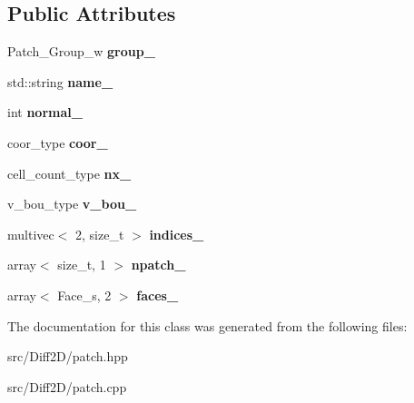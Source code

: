\subsection*{Public Attributes}
\begin{DoxyCompactItemize}
\item 
\hypertarget{classPatch_a93fff2891647c4109c16cb4ec2079545}{
Patch\_\-Group\_\-w {\bfseries group\_\-}}
\label{classPatch_a93fff2891647c4109c16cb4ec2079545}

\item 
\hypertarget{classPatch_a133d268d88897aef8b20ca7da98b9cdb}{
std::string {\bfseries name\_\-}}
\label{classPatch_a133d268d88897aef8b20ca7da98b9cdb}

\item 
\hypertarget{classPatch_a01951c7c7aec32d184e11869ab23877d}{
int {\bfseries normal\_\-}}
\label{classPatch_a01951c7c7aec32d184e11869ab23877d}

\item 
\hypertarget{classPatch_a3beca2ce16697d8e8097ba92ee6bdc29}{
coor\_\-type {\bfseries coor\_\-}}
\label{classPatch_a3beca2ce16697d8e8097ba92ee6bdc29}

\item 
\hypertarget{classPatch_aa69a7e422610ce91ad4fb60c88cadbf0}{
cell\_\-count\_\-type {\bfseries nx\_\-}}
\label{classPatch_aa69a7e422610ce91ad4fb60c88cadbf0}

\item 
\hypertarget{classPatch_a10f2316309ff37fb1238153527eeab48}{
v\_\-bou\_\-type {\bfseries v\_\-bou\_\-}}
\label{classPatch_a10f2316309ff37fb1238153527eeab48}

\item 
\hypertarget{classPatch_af272c0110d640ddd191492fc9cc62990}{
multivec$<$ 2, size\_\-t $>$ {\bfseries indices\_\-}}
\label{classPatch_af272c0110d640ddd191492fc9cc62990}

\item 
\hypertarget{classPatch_aaa96294c5c204449ca53209b040ae06c}{
array$<$ size\_\-t, 1 $>$ {\bfseries npatch\_\-}}
\label{classPatch_aaa96294c5c204449ca53209b040ae06c}

\item 
\hypertarget{classPatch_a6d0bbabb9b7b1928bda12255b312fedd}{
array$<$ Face\_\-s, 2 $>$ {\bfseries faces\_\-}}
\label{classPatch_a6d0bbabb9b7b1928bda12255b312fedd}

\end{DoxyCompactItemize}


The documentation for this class was generated from the following files:\begin{DoxyCompactItemize}
\item 
src/Diff2D/patch.hpp\item 
src/Diff2D/patch.cpp\end{DoxyCompactItemize}
